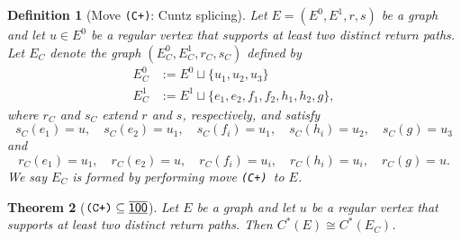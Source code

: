\documentclass[12pt]{amsbook}%
\newtheorem{theor}{Theorem}[section]
\theoremstyle{defin}
\newtheorem{defin}[theor]{Definition}
\theoremstyle{remark}
\numberwithin{equation}{chapter}
\numberwithin{theor}{section}
\newcommand{\xyzrel}[1]{\mbox{$\overline{\underline{\mathsf{ #1}}}$}}
\newcommand{\CCCp}{\mbox{\texttt{\textup{(C+)}}}}
\begin{document}
\begin{defin}[Move \CCCp: Cuntz splicing] \label{CCCp}\index{Cp@\CCCp}
Let $E = (E^0 , E^1 , r , s )$ be a graph and let $u \in E^0$ be a regular vertex that supports at least two distinct return paths.
Let $E_{C}$ denote the graph $(E_{C}^0 , E_{C}^1 , r_{C} , s_{C})$ defined by 
\begin{align*}
E_{C}^0 &:= E^0\sqcup\{u_1 , u_2, u_3 \} \\
E_{C}^1 &:= E^1\sqcup\{e_1 , e_2 , f_1 , f_2 , h_1 , h_2 , g\},
\end{align*}
where $r_{C}$ and $s_{C}$ extend $r$ and $s$, respectively, and satisfy
$$s_{C} (e_1 ) = u,\quad s_{C} (e_2 ) = u_1 ,\quad s_{C} (f_i ) = u_1 ,\quad s_{C} (h_i ) = u_2 , \quad s_{C} ( g) = u_3$$
and
$$r_{C} (e_1 ) = u_1 ,\quad r_{C} (e_2 ) = u,\quad r_{C} (f_i ) = u_i ,\quad r_{C} (h_i ) = u_i , \quad r_{C} ( g) = u.$$
We say $E_{C}$ is formed by performing move \CCCp\ to $E$. 
\end{defin}

\begin{theor}[$\CCCp\subseteq \xyzrel{100}$]\label{thm:iso-cuntzsplice+}
Let $E$ be a graph and let $u$ be a regular vertex that supports at least two distinct return paths.  Then $C^*(E) \cong C^*( E_{C} )$.
\end{theor}
\end{document}
